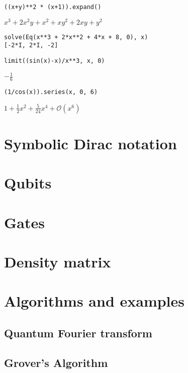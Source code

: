 \documentclass[aps,pra,groupedaddress]{revtex4-1}
\begin{document}
\begin{verbatim}
((x+y)**2 * (x+1)).expand()
\end{verbatim}

$ x^{3} + 2 x^{2} y + x^{2} + x y^{2} + 2 x y + y^{2} $

\begin{verbatim}
solve(Eq(x**3 + 2*x**2 + 4*x + 8, 0), x)
[-2*I, 2*I, -2]
\end{verbatim}

\begin{verbatim}
limit((sin(x)-x)/x**3, x, 0)
\end{verbatim}

$ - \frac{1}{6} $

\begin{verbatim}
(1/cos(x)).series(x, 0, 6)
\end{verbatim}

$ 1 + \frac{1}{2} x^{2} + \frac{5}{24} x^{4} + \mathcal{O}\left(x^{6}\right) $

\section{Symbolic Dirac notation}

\section{Qubits}

\section{Gates}

\section{Density matrix}

\section{Algorithms and examples}

\subsection{Quantum Fourier transform}

\subsection{Grover's Algorithm}
\end{document}
